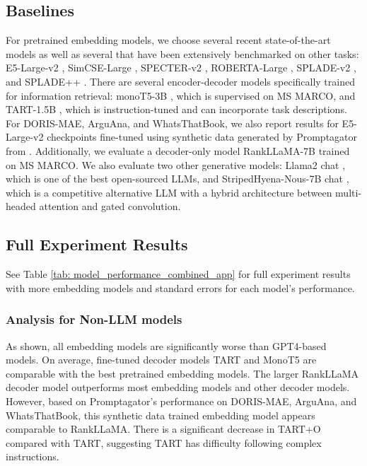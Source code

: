 \documentclass[11pt]{article}
\begin{document}
\subsection{Baselines}
\label{ssec: appendix_baselines}
For pretrained embedding models, we choose several recent state-of-the-art models as well as several that have been extensively benchmarked on other tasks: E5-Large-v2 \cite{e5}, SimCSE-Large \cite{simcse}, SPECTER-v2 \cite{specterv2}, ROBERTA-Large \cite{roberta}, SPLADE-v2 \cite{spladev2}, and SPLADE++ \cite{splade++}. There are several encoder-decoder models specifically trained for information retrieval: monoT5-3B \cite{monot5}, which is supervised on MS MARCO, and TART-1.5B \cite{asai-etal-2023-task}, which is instruction-tuned and can incorporate task descriptions. For DORIS-MAE, ArguAna, and WhatsThatBook, we also report results for E5-Large-v2 checkpoints fine-tuned using synthetic data generated by Promptagator \cite{promptagator} from \cite{ir2}. Additionally, we evaluate a decoder-only model RankLLaMA-7B \cite{rankllama} trained on MS MARCO.
We also evaluate two other generative models: Llama2 chat \cite{llama2}, which is one of the best open-sourced LLMs, and StripedHyena-Nous-7B chat \cite{StripedHyena}, which is a competitive alternative LLM with a hybrid architecture between multi-headed attention and gated convolution. 

\subsection{Full Experiment Results}
\label{ssec: appendix_full experiment results}
See Table \ref{tab: model_performance_combined_app} for full experiment results with more embedding models and standard errors for each model's performance. 
\subsubsection{Analysis for Non-LLM models}
As shown, all embedding models are significantly worse than GPT4-based models. On average, fine-tuned decoder models TART and MonoT5 are comparable with the best pretrained embedding models. The larger RankLLaMA decoder model outperforms most embedding models and other decoder models. However, based on Promptagator's performance on DORIS-MAE, ArguAna, and WhatsThatBook, this synthetic data trained embedding model appears comparable to RankLLaMA. There is a significant decrease in TART+O compared with TART, suggesting TART has difficulty following complex instructions.
\end{document}
